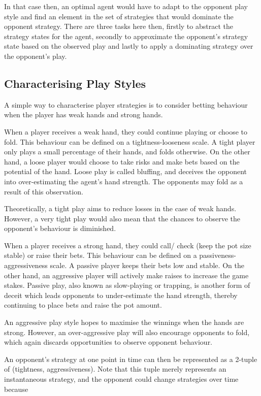 \documentclass{article}
\begin{document}
In that case then, an optimal agent would have to adapt to the opponent play style and find an element in the set of strategies that would dominate the opponent strategy.  There are three tasks here then, firstly to abstract the strategy states for the agent, secondly to approximate the opponent's strategy state based on the observed play and lastly to apply a dominating strategy over the opponent's play.

\subsection{Characterising Play Styles}
A simple way to characterise player strategies is to consider betting behaviour when the player has weak hands and strong hands. 

When a player receives a weak hand, they could continue playing or choose to fold. This behaviour can be defined on a tightness-looseness scale. A tight player only plays a small percentage of their hands, and folds otherwise. On the other hand, a loose player would choose to take risks and make bets based on the potential of the hand. Loose play is called bluffing, and deceives the opponent into over-estimating the agent's hand strength. The opponents may fold as a result of this observation.

Theoretically, a tight play aims to reduce losses in the case of weak hands. However, a very tight play would also mean that the chances to observe the opponent's behaviour is diminished.

When a player receives a strong hand, they could call/ check (keep the pot size stable) or raise their bets. This behaviour can be defined on a passiveness-aggressiveness scale. A passive player keeps their bets low and stable. On the other hand, an aggressive player will actively make raises to increase the game stakes. Passive play, also known as slow-playing or trapping, is another form of deceit which leads opponents to under-estimate the hand strength, thereby continuing to place bets and raise the pot amount.

An aggressive play style hopes to maximise the winnings when the hands are strong. However, an over-aggressive play will also encourage opponents to fold, which again discards opportunities to observe opponent behaviour.

An opponent's strategy at one point in time can then be represented as a 2-tuple of (tightness, aggressiveness). Note that this tuple merely represents an instantaneous strategy, and the opponent could change strategies over time because
\end{document}
